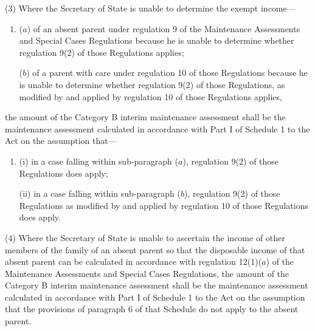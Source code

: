 \documentclass[a4paper,12pt]{article}
\begin{document}
(3) Where 
the Secretary of State  %
is unable to determine the exempt income—
\begin{enumerate}\item[]
($a$) of an absent parent under regulation 9 of the Maintenance Assessments and Special Cases Regulations because he is unable to determine whether regulation 9(2) of those Regulations applies;

($b$) of a parent with care under regulation 10 of those Regulations because he is unable to determine whether regulation 9(2) of those Regulations, as modified by and applied by regulation 10 of those Regulations applies,
\end{enumerate}
the amount of the Category B interim maintenance assessment shall be the maintenance assessment calculated in accordance with Part I of Schedule 1 to the Act on the assumption that—
\begin{enumerate}\item[]
(i) in a case falling within sub-paragraph ($a$), regulation 9(2) of those Regulations does apply;

(ii) in a case falling within sub-paragraph ($b$), regulation 9(2) of those Regulations as modified by and applied by regulation 10 of those Regulations does apply.
\end{enumerate}


(4) Where 
the Secretary of State  %
is unable to ascertain the income of other members of the family of an absent parent so that the disposable income of that absent parent can be calculated in accordance with regulation 12(1)($a$) of the Maintenance Assessments and Special Cases Regulations, the amount of the Category B interim maintenance assessment shall be the maintenance assessment calculated in accordance with Part I of Schedule 1 to the Act on the assumption that the provisions of paragraph 6 of that Schedule do not apply to the absent parent.
\end{document}

